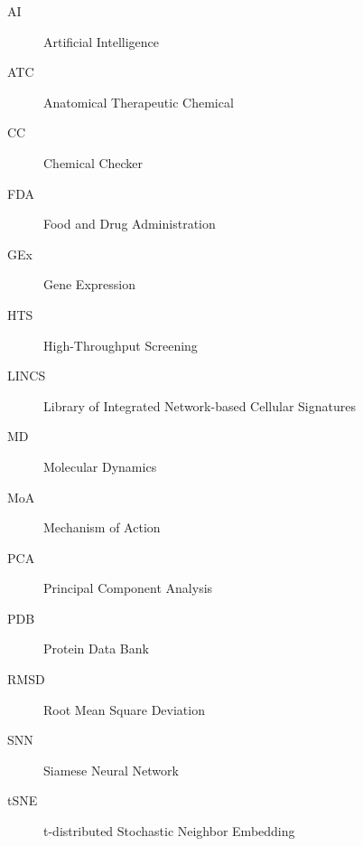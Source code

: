 

\begin{description}
    \item[AI] Artificial Intelligence
    \item[ATC] Anatomical Therapeutic Chemical
    \item[CC] Chemical Checker
    \item[FDA] Food and Drug Administration
    \item[GEx] Gene Expression
    \item[HTS] High-Throughput Screening
    \item[LINCS] Library of Integrated Network-based Cellular Signatures
    \item[MD] Molecular Dynamics
    \item[MoA] Mechanism of Action
    \item[PCA] Principal Component Analysis
    \item[PDB] Protein Data Bank
    \item[RMSD] Root Mean Square Deviation 
    \item[SNN] Siamese Neural Network
    \item[tSNE] t-distributed Stochastic Neighbor Embedding
\end{description}

